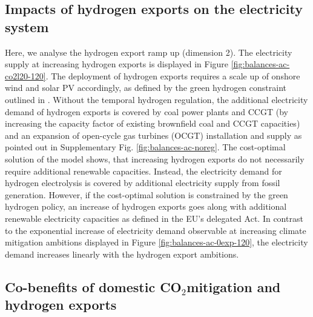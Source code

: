 \documentclass[5p,numafflabel]{elsarticle}
\newcommand{\co}{\ce{CO2}~}
\def\co{CO${}_2${\:}}
\begin{document}
\subsection*{Impacts of hydrogen exports on the electricity system}
\label{subsec:increase_h2}

Here, we analyse the hydrogen export ramp up (dimension 2). The electricity supply at increasing hydrogen exports is displayed in Figure \ref{fig:balances-ac-co2l20-120}. The deployment of hydrogen exports requires a scale up of onshore wind and solar PV accordingly, as defined by the green hydrogen constraint outlined in .
Without the temporal hydrogen regulation, the additional electricity demand of hydrogen exports is covered by coal power plants and CCGT (by increasing the capacity factor of existing brownfield coal and CCGT capacities) and an expansion of open-cycle gas turbines (OCGT) installation and supply as pointed out in Supplementary Fig. \ref{fig:balances-ac-noreg}.
The cost-optimal solution of the model shows, that increasing hydrogen exports do not necessarily require additional renewable capacities. Instead, the electricity demand for hydrogen electrolysis is covered by additional electricity supply from fossil generation. However, if the cost-optimal solution is constrained by the green hydrogen policy, an increase of hydrogen exports goes along with additional renewable electricity capacities as defined in the EU's delegated Act.
In contrast to the exponential increase of electricity demand observable at increasing climate mitigation ambitions displayed in Figure \ref{fig:balances-ac-0exp-120}, the electricity demand increases linearly with the hydrogen export ambitions.




\subsection*{Co-benefits of domestic \co mitigation and hydrogen exports}
\label{subsec:benefits}
\end{document}
